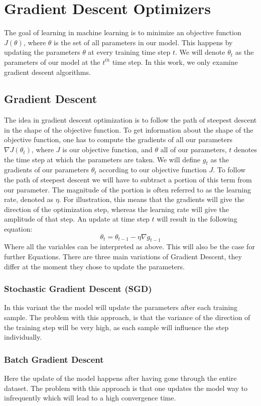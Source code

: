 \section{Gradient Descent Optimizers} \label{optimizers}
The goal of learning in machine learning is to minimize an objective function  $J(\theta)$, where $\theta$ is the set of all parameters in our model. This happens by updating the parameters $\theta$ at every training time step $t$. We will denote $\theta_{t}$ as the parameters of our model at the $t^{th}$ time step. In this work, we only examine gradient descent algorithms.
\subsection{Gradient Descent}
The idea in gradient descent optimization is to follow the path of steepest descent in the shape of the objective function. To get information about the shape of the objective function, one has to compute the gradients of all our parameters   $\nabla J(\theta_{t})$, where $J$ is our objective function, and $\theta$ all of our parameters, $t$ denotes the time step at which the parameters are taken. We will define $g_{t}$ as the gradients of our parameters $\theta_t$ according to our objective function $J$. To follow the path of steepest descent we will have to subtract a portion of this term from our parameter. The magnitude of the portion is often referred to as the learning rate, denoted as $\eta$. For illustration, this means that the gradients will give the direction of the optimization step, whereas the learning rate will give the amplitude of that step. An update at time step $t$ will result in the following equation:
\begin{equation}
\theta_t = \theta_{t-1} - \eta \nabla g_{t-1}
\end{equation}
Where all the variables can be interpreted as above. This will also be the case for further Equations. 
There are three main variations of Gradient Descent, they differ at the moment they chose to update the parameters.
\subsubsection{Stochastic Gradient Descent (SGD)} 
In this variant the the model will update the parameters after each training sample. The problem with this approach, is that the variance of the direction of the training step will be very high, as each sample will influence the step individually.

\subsubsection{Batch Gradient Descent} 
Here the update of the model happens after having gone through the entire dataset. The problem with this approach is that one updates the model way to infrequently which will lead to a high convergence time.
